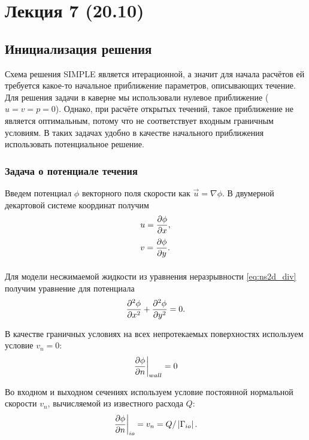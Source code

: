 \section{Лекция 7 (20.10)}

\subsection{Инициализация решения}
\label{sec:ns2d-init}

Схема решения SIMPLE является итерационной, а значит для начала расчётов ей требуется
какое-то начальное приближение параметров, описывающих течение.
Для решения задачи в каверне мы использовали нулевое приближение ($u=v=p=0$).
Однако, при расчёте открытых течений, такое приближение не является оптимальным,
потому что не соответствует входным граничным условиям.
В таких задачах удобно в качестве начального приближения использовать потенциальное решение.

\subsubsection{Задача о потенциале течения}
Введем потенциал $\phi$ векторного поля скорости как $\vec{u} = \nabla\phi$.
В двумерной декартовой системе координат получим
\begin{equation}
\label{eq:potential2}
\begin{array}{l}
	u = \dfrac{\partial \phi}{\partial x}, \\[10pt]
	v = \dfrac{\partial \phi}{\partial y}. \\[10pt]
\end{array}
\end{equation}

Для модели несжимаемой жидкости из уравнения неразрывности \cref{eq:ns2d_div}
получим уравнение для потенциала
\begin{equation}
	\label{eq:potential2_eq}
	\frac{\partial^2 \phi}{\partial x^2} + \frac{\partial^2 \phi}{\partial y^2} = 0.
\end{equation}

В качестве  граничных условиях на всех непротекаемых поверхностях используем условие
$v_n = 0$:
\begin{equation}
	\label{eq:potential2_bcwall}
	\left. \frac{\partial \phi}{\partial n} \right|_{wall} = 0
\end{equation}

Во входном и выходном сечениях используем условие постоянной нормальной скорости $v_n$,
вычисляемой из известного расхода $Q$:
\begin{equation}
	\label{eq:potential2_bcio}
	\left. \frac{\partial \phi}{\partial n} \right|_{io} = v_n = Q/\left|\Gamma_{io}\right|.
\end{equation}

